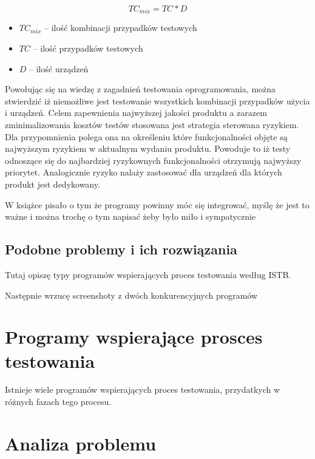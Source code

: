 \begin{equation}
TC_{mix} = TC * D
\end{equation}
	\begin{itemize}
		\item $TC_{mix}$ -- ilość kombinacji przypadków testowych
		\item $TC$ -- ilość przypadków testowych
		\item $D$ -- ilość urządzeń
	\end{itemize}




Powołując się na wiedzę z zagadnień testowania oprogramowania, można stwierdzić iż niemożliwe jest testowanie wszystkich kombinacji przypadków użycia i urządzeń. Celem zapewnienia najwyższej jakości produktu a zarazem zminimalizowania kosztów testów stosowana jest strategia sterowana ryzykiem. Dla przypomnienia polega ona na określeniu które funkcjonalności objęte są najwyższym ryzykiem w aktualnym wydaniu produktu. Powoduje to iż testy odnoszące się do najbardziej ryzykownych funkcjonalności otrzymują najwyższy priorytet. Analogicznie ryzyko nalaży zastosować dla urządzeń dla których produkt jest dedykowany.

W książce pisało o tym że programy powinny móc się integrować, myślę że jest to ważne i można trochę o tym napisać żeby było miło i sympatycznie
\section{Podobne problemy i ich rozwiązania}
Tutaj opiszę typy programów wspierających proces testowania według ISTB.

Następnie wrzucę screenshoty z dwóch konkurencyjnych programów
\chapter{Programy wspierające prosces testowania}
Istnieje wiele programów wspierających proces testowania, przydatkych w różnych fazach tego procesu.
\chapter{Analiza problemu}














